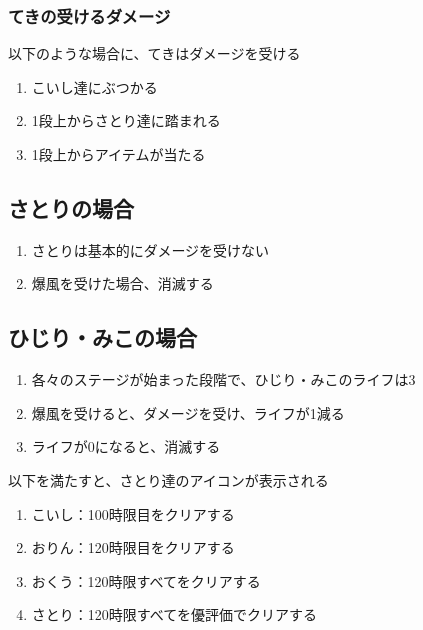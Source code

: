\subsubsection{てきの受けるダメージ}
以下のような場合に、てきはダメージを受ける
\begin{enumerate}[label={\sarrow}]
\item こいし達にぶつかる
\item 1段上からさとり達に踏まれる
\item 1段上からアイテムが当たる
\end{enumerate}


\subsection{さとりの場合}
\begin{enumerate}[label={\sarrow}]
\item さとりは基本的にダメージを受けない
\item 爆風を受けた場合、消滅する
\end{enumerate}


\clearpage
\subsection{ひじり・みこの場合}
\begin{enumerate}[label={\sarrow}]
\item 各々のステージが始まった段階で、ひじり・みこのライフは3
\item 爆風を受けると、ダメージを受け、ライフが1減る
\item ライフが0になると、消滅する
\end{enumerate}



以下を満たすと、さとり達のアイコンが表示される
\begin{enumerate}[label={\sarrow}]
\item こいし：100時限目をクリアする
\item おりん：120時限目をクリアする
\item おくう：120時限すべてをクリアする
\item さとり：120時限すべてを優評価でクリアする
\end{enumerate}



